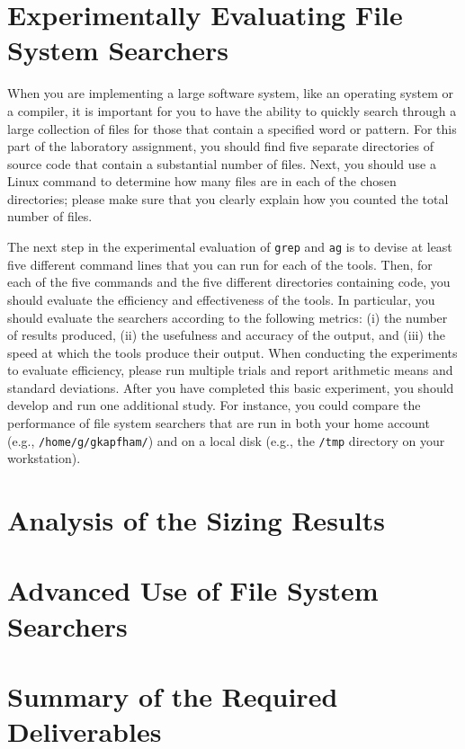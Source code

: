 \section*{Experimentally Evaluating File System Searchers}

When you are implementing a large software system, like an operating system or a compiler, it is important for you to have
the ability to quickly search through a large collection of files for those that contain a specified word or pattern.
For this part of the laboratory assignment, you should find five separate directories of source code that contain a
substantial number of files. Next, you should use a Linux command to determine how many files are in each of the chosen
directories; please make sure that you clearly explain how you counted the total number of files.

The next step in the experimental evaluation of {\tt grep} and {\tt ag} is to devise at least five different command
lines that you can run for each of the tools. Then, for each of the five commands and the five different directories
containing code, you should evaluate the efficiency and effectiveness of the tools. In particular, you should evaluate
the searchers according to the following metrics: (i) the number of results produced, (ii) the usefulness and accuracy
of the output, and (iii) the speed at which the tools produce their output. When conducting the experiments to evaluate
efficiency, please run multiple trials and report arithmetic means and standard deviations. After you have completed
this basic experiment, you should develop and run one additional study. For instance, you could compare the performance
of file system searchers that are run in both your home account (e.g., {\tt /home/g/gkapfham/}) and on a local disk
(e.g., the {\tt /tmp} directory on your workstation).

\section*{Analysis of the Sizing Results}

\section*{Advanced Use of File System Searchers}

\section*{Summary of the Required Deliverables}

